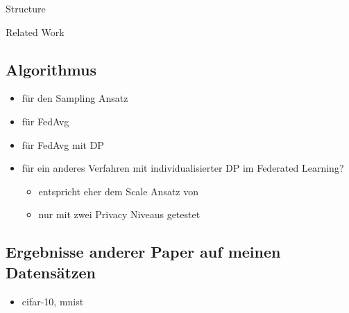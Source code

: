 \begin{chapter}{Structure}
\begin{section}{Related Work}
		\subsection{Algorithmus}
		\begin{itemize}
			\item \cite{boenisch:2023} für den Sampling Ansatz
			\item \cite{mcmahan:2016} für FedAvg
			\item \cite{mcmahan:2018} für FedAvg mit DP
			\item \cite{aldaghri:2023} für ein anderes Verfahren mit individualisierter DP im Federated Learning?
			\begin{itemize}
				\item entspricht eher dem Scale Ansatz von \cite{boenisch:2023}
				\item nur mit zwei \glqq{}Privacy Niveaus\grqq{} getestet
			\end{itemize}
		\end{itemize}
		
		\subsection{Ergebnisse anderer Paper auf meinen Datensätzen}
		
		\begin{itemize}
			\item cifar-10, mnist \cite{sun:2021}
		\end{itemize}
	\end{section}
\end{chapter}